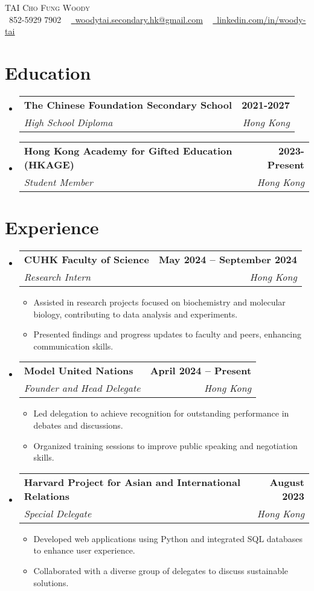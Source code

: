 \documentclass[letterpaper,11pt]{article}
\makeatletter
\newcommand{\resumeItem}[1]{
  \item\small{
    {#1 \vspace{-2pt}}
  }
}
\newcommand{\resumeSubheading}[4]{
  \vspace{-2pt}\item
    \begin{tabular*}{1.0\textwidth}[t]{l@{\extracolsep{\fill}}r}
      \textbf{#1} & \textbf{\small #2} \\
      \textit{\small#3} & \textit{\small #4} \\
    \end{tabular*}\vspace{-7pt}
}
\newcommand{\resumeItemListStart}{\begin{itemize}}
\newcommand{\resumeItemListEnd}{\end{itemize}\vspace{-5pt}}
\makeatother
\begin{document}
\begin{center}
    {\Huge \scshape TAI Cho Fung Woody} \\ \vspace{1pt}
    \small \raisebox{-0.1\height}\faPhone\ 852-5929 7902 ~ 
    \href{mailto:woodytai.secondary.hk@gmail.com}{\raisebox{-0.2\height}\faEnvelope\  \underline{woodytai.secondary.hk@gmail.com}} ~ 
    \href{https://linkedin.com/in/woody-tai/}{\raisebox{-0.2\height}\faLinkedin\ \underline{linkedin.com/in/woody-tai}}  
    \vspace{-8pt}
\end{center}

\section{Education}
  \resumeItemListStart
    \resumeSubheading
      {The Chinese Foundation Secondary School}{2021-2027}
      {High School Diploma}{Hong Kong}
    \resumeSubheading
      {Hong Kong Academy for Gifted Education (HKAGE)}{2023-Present}
      {Student Member}{Hong Kong}
  \resumeItemListEnd

\section{Experience}
  \resumeItemListStart
    \resumeSubheading
      {CUHK Faculty of Science}{May 2024 -- September 2024}
      {Research Intern}{Hong Kong}
      \resumeItemListStart
        \resumeItem{Assisted in research projects focused on biochemistry and molecular biology, contributing to data analysis and experiments.}
        \resumeItem{Presented findings and progress updates to faculty and peers, enhancing communication skills.}
      \resumeItemListEnd

    \resumeSubheading
      {Model United Nations}{April 2024 -- Present}
      {Founder and Head Delegate}{Hong Kong}
      \resumeItemListStart
        \resumeItem{Led delegation to achieve recognition for outstanding performance in debates and discussions.}
        \resumeItem{Organized training sessions to improve public speaking and negotiation skills.}
      \resumeItemListEnd

    \resumeSubheading
      {Harvard Project for Asian and International Relations}{August 2023}
      {Special Delegate}{Hong Kong}
      \resumeItemListStart
        \resumeItem{Developed web applications using Python and integrated SQL databases to enhance user experience.}
        \resumeItem{Collaborated with a diverse group of delegates to discuss sustainable solutions.}
      \resumeItemListEnd
  \resumeItemListEnd
\end{document}
